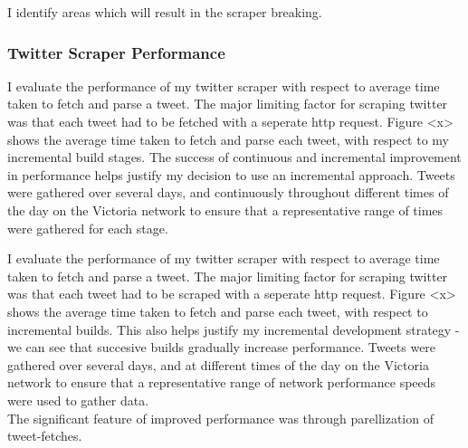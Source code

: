 I identify areas which will result in the scraper breaking. 

\subsubsection{Twitter Scraper Performance}
I evaluate the performance of my twitter scraper with respect to average time taken to fetch and parse a tweet. The major limiting factor for scraping twitter was that each tweet had to be fetched with a seperate http request. Figure <x> shows the average time taken to fetch and parse each tweet, with respect to my incremental build stages. The success of continuous and incremental improvement in performance helps justify my decision to use an incremental approach. Tweets were gathered over several days, and continuously throughout different times of the day on the Victoria network to ensure that a representative range of times were gathered for each stage. 


I evaluate the performance of my twitter scraper with respect to average time taken to fetch and parse a tweet. The major limiting factor for scraping twitter was that each tweet had to be scraped with a seperate http request. Figure <x> shows the average time taken to fetch and parse each tweet, with respect to incremental builds. This also helps justify my incremental development strategy - we can see that succesive builds gradually increase performance. Tweets were gathered over several days, and at different times of the day on the Victoria network to ensure that a representative range of network performance speeds were used to gather data.\\

\noindent The significant feature of improved performance was through parellization of tweet-fetches. 

